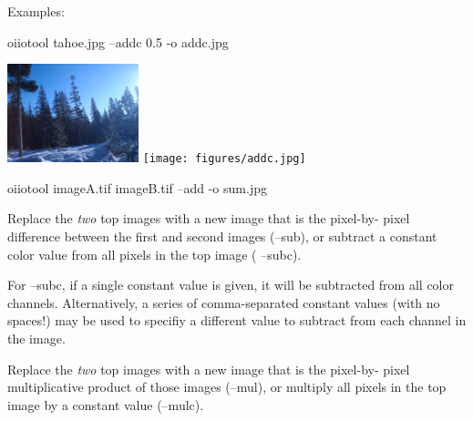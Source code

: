 

\noindent Examples:
\begin{code}
    oiiotool tahoe.jpg --addc 0.5 -o addc.jpg
\end{code}
\spc \includegraphics[width=1.5in]{figures/tahoe-small.jpg}
\raisebox{40pt}{\large $\rightarrow$}
\texttt{[image: figures/addc.jpg]} \\

\vspace{12pt}

\begin{code}
    oiiotool imageA.tif imageB.tif --add -o sum.jpg
\end{code}
\apiend

Replace the \emph{two} top images with a new image that is the pixel-by-
pixel difference between the first and second images ({\cf --sub}), or
subtract a constant color value from all pixels in the top image ({\cf
--subc}).

For {\cf --subc}, if a single constant value is given, it will be subtracted
from all color channels. Alternatively, a series of comma-separated constant
values (with no spaces!) may be used to specifiy a different value to
subtract from each channel in the image.
\apiend

Replace the \emph{two} top images with a new image that is the pixel-by-
pixel multiplicative product of those images ({\cf --mul}), or multiply all
pixels in the top image by a constant value ({\cf --mulc}).

